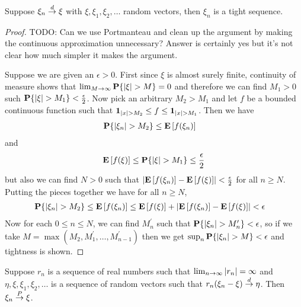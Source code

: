 \begin{lem}\label{WeakConvergenceImpliesTight}Suppose $\xi_n \overset{d}\to
  \xi$ with $\xi, \xi_1, \xi_2, \dots$ random vectors, then $\xi_n$ is a tight sequence.
\end{lem}
\begin{proof}
TODO: Can we use Portmanteau and clean up the argument by making the
continuous approximation unnecessary?  Answer is certainly yes but
it's not clear how much simpler it makes the argument.

Suppose we are given an $\epsilon > 0$.  First since $\xi$ is almost surely finite, continuity of measure shows
that $\lim_{M \to \infty} \textbf{P}\{\left \vert \xi \right \vert > M\} = 0$ and
therefore we can find $M_1 > 0$ such $\textbf{P}\{\left \vert \xi \right \vert > M_1\} <
\frac{\epsilon}{2}$.   Now pick an arbitrary $M_2 > M_1$ and let $f$ be a
bounded continuous function such that $\textbf{1}_{\left \vert x \right \vert > M_2}
\leq f \leq \textbf{1}_{\left \vert x \right \vert > M_1}$.  Then we have 
\begin{align*}
\textbf{P}\{\left \vert \xi_n \right \vert > M_2\} &\leq \textbf{E}\left[f(\xi_n)\right] 
\end{align*}
and 
\begin{align*}
\textbf{E}\left[f(\xi)\right] \leq \textbf{P}\{\left \vert \xi \right \vert > M_1\} \leq \frac{\epsilon}{2}
\end{align*}
but also we can find $N > 0$ such that $\left \vert \textbf{E}\left[f(\xi_n)\right] -
  \textbf{E}\left[f(\xi)\right]  \right \vert < \frac{\epsilon}{2}$ for all $n \geq
N$.  Putting the pieces together we have for all $n \geq N$, 
\begin{align*}
\textbf{P}\{\left \vert \xi_n \right \vert > M_2\} &\leq \textbf{E}\left[f(\xi_n)\right] \leq
\textbf{E}\left[f(\xi)\right] + \left \vert \textbf{E}\left[f(\xi_n)\right] -
  \textbf{E}\left[f(\xi)\right] \right \vert < \epsilon
\end{align*}
Now for each $0 \leq n \leq N$, we can find $M^\prime_n$ such that
$\textbf{P}\{\left \vert \xi_n \right \vert > M^\prime_n\} < \epsilon$, so if we take
$M=\max(M_2, M^\prime_1, \dots, M^\prime_{n-1})$ then we get
$\sup_n\textbf{P}\{\left \vert \xi_n \right \vert > M\} < \epsilon$ and tightness is shown.
\end{proof}
\begin{lem}\label{ScaledTightSequenceConvergeZeroProb}Suppose $r_n$ is a sequence of real numbers such that
  $\lim_{n \to \infty} \left \vert r_n \right \vert = \infty$ and
  $\eta, \xi, \xi_1, \xi_2, \dots$ is a sequence of random vectors such that $r_n(\xi_n -
  \xi) \overset{d}\to \eta$.  Then $\xi_n \overset{P}\to \xi$.
\end{lem}
